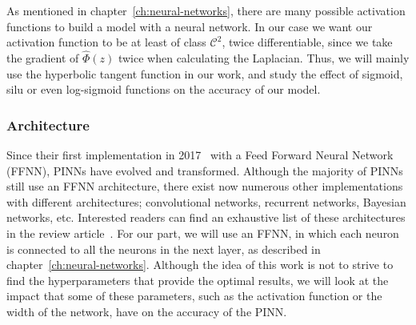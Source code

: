 As mentioned in chapter~\ref{ch:neural-networks}, there are many possible activation functions to build a model with a neural network. In our case we want our activation function to be at least of class $\mathcal{C}^2$, twice differentiable, since we take the gradient of $\hat{\Phi}(z)$ twice when calculating the Laplacian. Thus, we will mainly use the hyperbolic tangent function in our work, and study the effect of sigmoid, silu or even log-sigmoid functions on the accuracy of our model.



\subsubsection{Architecture}

Since their first implementation in 2017~\cite{raissi_physics_2017} with a Feed Forward Neural Network (FFNN), PINNs have evolved and transformed. Although the majority of PINNs still use an FFNN architecture, there exist now numerous other implementations with different architectures; convolutional networks, recurrent networks, Bayesian networks, etc. Interested readers can find an exhaustive list of these architectures in the review article~\cite{cuomo_scientific_2022}. For our part, we will use an FFNN, in which each neuron is connected to all the neurons in the next layer, as described in chapter~\ref{ch:neural-networks}. Although the idea of this work is not to strive to find the hyperparameters that provide the optimal results, we will look at the impact that some of these parameters, such as the activation function or the width of the network, have on the accuracy of the PINN.
